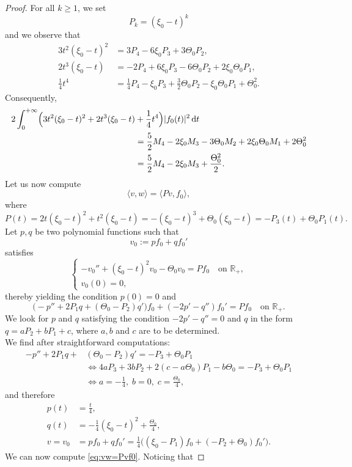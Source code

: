 \documentclass[JEP,XML,SOM,Unicode,NoFloatCountersInSection,published]{cedram}
\newcommand{\rd}{\,\mathrm{d}}
\theoremstyle{plain}
\theoremstyle{definition}
\newcommand{\R}{\mathbb{R}}
\begin{document}
\begin{proof}
For all $k\geq 1$, we set
\[
P_k=(\xi_0-t)^k
\]
and we observe that
\[
\begin{aligned}
3t^2(\xi_0-t)^2&=3P_4-6\xi_0P_3+3\Theta_0P_2,\\
2t^3(\xi_0-t)&=-2P_4+6\xi_0P_3-6\Theta_0P_2+2\xi_0\Theta_0P_1,\\
\frac14t^4&=\frac14P_4-\xi_0P_3+\frac32\Theta_0P_2-\xi_0\Theta_0P_1+\Theta_0^2.
\end{aligned}
\]
Consequently,
\begin{align*}
2\int_0^{+\infty} \Bigl(3t^2(\xi_0-t)^2+2t^3(\xi_0-t)&+\frac14t^4\Bigr)|f_0(t)|^2\rd t\\
&=\frac{5}2M_4-2\xi_0M_3-3\Theta_0M_2+2\xi_0\Theta_0M_1+2\Theta_0^2\\
&=\frac52M_4-2\xi_0M_3+\frac{\Theta_0^2}2.
\end{align*}
Let us now compute
\begin{equation}\label{eq:vw=Pvf0}
\langle v,w\rangle=\langle Pv,f_0\rangle,
\end{equation}
where
\[
P(t)=2t(\xi_0-t)^2+t^2(\xi_0-t)=-(\xi_0-t)^3+\Theta_0(\xi_0-t)=-P_3(t)+\Theta_0P_1(t).
\]
Let $p,q$ be two polynomial functions such that
\[
v_0:=pf_0+qf_0'
\]
satisfies
\[
\begin{cases}
-v_0''+(\xi_0-t)^2v_0-\Theta_0v_0=Pf_0\quad\text{on~}\R_+,\\
v_0(0)=0,
\end{cases}
\]
thereby yielding the condition $p(0)=0$ and
\[
\bigl(-p''+2P_1q+(\Theta_0-P_2)q' \bigr)f_0+(-2p'-q'')f_0'=Pf_0\quad\text{on~}\R_+.
\]
We look for $p$ and $q$ satisfying the condition $-2p'-q''=0$ and $q$ in the form $q=aP_2+bP_1+c$, where $a,b$ and $c$ are to be determined. \\
We find after straightforward computations:
\[
\begin{aligned}
-p''+2P_1q+&(\Theta_0-P_2)q'=-P_3+\Theta_0P_1\\
&\iff 4aP_3+3bP_2+2(c-a\Theta_0)P_1-b\Theta_0=-P_3+\Theta_0P_1\\
&\iff a=-\frac14,\;b=0,\;c=\frac{\Theta_0}4,
\end{aligned}
\]
and therefore\vspace*{-3pt}
\[
\begin{aligned}
p(t)&=\frac{t}4, \\ q(t)&=-\frac14(\xi_0-t)^2+\frac{\Theta_0}4,\\ v=v_0&=pf_0+qf_0'
=\frac14\bigl((\xi_0-P_1)f_0+(-P_2+\Theta_0)f_0' \bigr).
\end{aligned}
\]
We can now compute \eqref{eq:vw=Pvf0}. Noticing that\vspace*{-3pt}

\end{proof}
\end{document}
